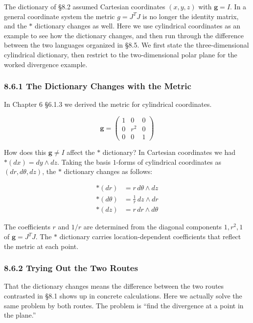 The dictionary of §8.2 assumed Cartesian coordinates \((x,y,z)\) with
\(\mathbf{g}=I\). In a general coordinate system the metric
\(g = J^T J\) is no longer the identity matrix, and the \(\ast\)
dictionary changes as well. Here we use cylindrical coordinates as an
example to see how the dictionary changes, and then run through the
difference between the two languages organized in §8.5. We first state
the three-dimensional cylindrical dictionary, then restrict to the
two-dimensional polar plane for the worked divergence example.

\hypertarget{the-dictionary-changes-with-the-metric}{%
\subsubsection{8.6.1 The Dictionary Changes with the
Metric}\label{the-dictionary-changes-with-the-metric}}

In Chapter 6 §6.1.3 we derived the metric for cylindrical coordinates.

\[\mathbf{g} = \begin{pmatrix} 1 & 0 & 0 \\ 0 & r^2 & 0 \\ 0 & 0 & 1 \end{pmatrix}\]

How does this \(\mathbf{g} \neq I\) affect the \(\ast\) dictionary? In
Cartesian coordinates we had \(\ast(dx) = dy \wedge dz\). Taking the
basis \(1\)-forms of cylindrical coordinates as \((dr, d\theta, dz)\),
the \(\ast\) dictionary changes as follows:

\[\begin{aligned}
\ast(dr) &= r\,d\theta \wedge dz \\
\ast(d\theta) &= \frac{1}{r}\,dz \wedge dr \\
\ast(dz) &= r\,dr \wedge d\theta
\end{aligned}\]

The coefficients \(r\) and \(1/r\) are determined from the diagonal
components \(1, r^2, 1\) of \(\mathbf{g} = J^T J\). The \(\ast\)
dictionary carries location-dependent coefficients that reflect the
metric at each point.

\hypertarget{trying-out-the-two-routes}{%
\subsubsection{8.6.2 Trying Out the Two
Routes}\label{trying-out-the-two-routes}}

That the dictionary changes means the difference between the two routes
contrasted in §8.1 shows up in concrete calculations. Here we actually
solve the same problem by both routes. The problem is ``find the
divergence at a point in the plane.''

